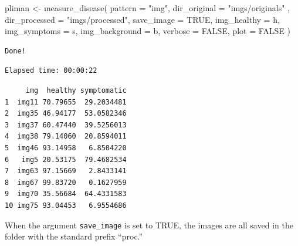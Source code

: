 \documentclass[
  letterpaper,
]{book}
\newenvironment{Shaded}{\begin{snugshade}}{\end{snugshade}}
\newcommand{\AttributeTok}[1]{\textcolor[rgb]{0.40,0.45,0.13}{#1}}
\newcommand{\ConstantTok}[1]{\textcolor[rgb]{0.56,0.35,0.01}{#1}}
\newcommand{\FunctionTok}[1]{\textcolor[rgb]{0.28,0.35,0.67}{#1}}
\newcommand{\NormalTok}[1]{\textcolor[rgb]{0.00,0.23,0.31}{#1}}
\newcommand{\OtherTok}[1]{\textcolor[rgb]{0.00,0.23,0.31}{#1}}
\newcommand{\SpecialCharTok}[1]{\textcolor[rgb]{0.37,0.37,0.37}{#1}}
\newcommand{\StringTok}[1]{\textcolor[rgb]{0.13,0.47,0.30}{#1}}
\begin{document}
\begin{Shaded}
\begin{Highlighting}[]
\NormalTok{pliman }\OtherTok{\textless{}{-}} \FunctionTok{measure\_disease}\NormalTok{(}
  \AttributeTok{pattern =} \StringTok{"img"}\NormalTok{,}
  \AttributeTok{dir\_original =} \StringTok{"imgs/originals"}\NormalTok{ ,}
  \AttributeTok{dir\_processed =} \StringTok{"imgs/processed"}\NormalTok{,}
  \AttributeTok{save\_image =} \ConstantTok{TRUE}\NormalTok{,}
  \AttributeTok{img\_healthy =}\NormalTok{ h,}
  \AttributeTok{img\_symptoms =}\NormalTok{ s,}
  \AttributeTok{img\_background =}\NormalTok{ b,}
  \AttributeTok{verbose =} \ConstantTok{FALSE}\NormalTok{,}
  \AttributeTok{plot =} \ConstantTok{FALSE}
\NormalTok{)}
\end{Highlighting}
\end{Shaded}

\begin{verbatim}
Done!
\end{verbatim}

\begin{verbatim}
Elapsed time: 00:00:22
\end{verbatim}

\begin{Shaded}
\end{Shaded}

\begin{verbatim}
     img  healthy symptomatic
1  img11 70.79655  29.2034481
2  img35 46.94177  53.0582346
3  img37 60.47440  39.5256013
4  img38 79.14060  20.8594011
5  img46 93.14958   6.8504220
6   img5 20.53175  79.4682534
7  img63 97.15669   2.8433141
8  img67 99.83720   0.1627959
9  img70 35.56684  64.4331583
10 img75 93.04453   6.9554686
\end{verbatim}

When the argument \texttt{save\_image} is set to TRUE, the images are
all saved in the folder with the standard prefix ``proc.''
\end{document}

